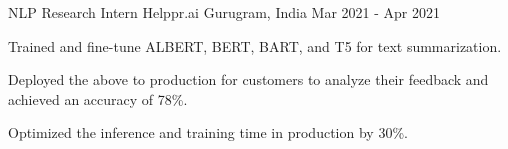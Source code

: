 \begin{cventries}

  \cventry
    {NLP Research Intern} %
    {Helppr.ai} %
    {Gurugram, India} %
    {Mar 2021 - Apr 2021} %
    {
      \begin{cvitems} %
        \item {Trained and fine-tune ALBERT, BERT, BART, and T5 for text summarization.}
        \item {Deployed the above to production for customers to analyze their feedback and achieved an accuracy of 78\%.}
        \item {Optimized the inference and training time in production by 30\%.}
      \end{cvitems}
    }

\end{cventries}
